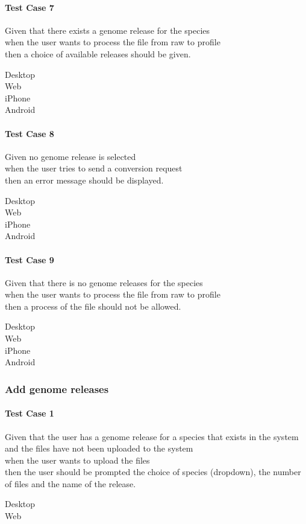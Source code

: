 \paragraph*{Test Case 7}
Given that there exists a genome release for the species \\ when the user wants to process the file from raw to profile \\ then a choice of available releases should be given.
\begin{description}
 \item[Desktop]
 \item[Web]
 \item[iPhone] \cmark
 \item[Android]
\end{description}
\paragraph*{Test Case 8}
Given no genome release is selected \\ when the user tries to send a conversion request \\ then an error message should be displayed.
\begin{description}
 \item[Desktop]
 \item[Web]
 \item[iPhone] \cmark
 \item[Android]
\end{description}
\paragraph*{Test Case 9}
Given that there is no genome releases for the species \\ when the user wants to process the file from raw to profile \\ then a process of the file should not be allowed.
\begin{description}
 \item[Desktop]
 \item[Web]
 \item[iPhone] \cmark
 \item[Android]
\end{description}


\subsubsection{Add genome releases}
\paragraph*{Test Case 1}
Given that the user has a genome release for a species that exists in the system and the files have not been uploaded to the system \\ when the user wants to upload the files \\ then the user should be prompted the choice of species (dropdown), the number of files and the name of the release.
\begin{description}
 \item[Desktop] \cmark
 \item[Web] \cmark
\end{description}

